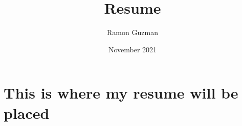 \documentclass{article}
\title{Resume}
\author{Ramon Guzman}
\date{November 2021}
\begin{document}
\maketitle

\section{This is where my resume will be placed}
\end{document}
